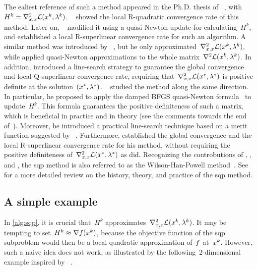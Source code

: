 The ealiest reference of such a method appeared in the Ph.D. thesis of \citeauthor{Wilson_1963}~\cite{Wilson_1963}, with~$H^k = \nabla_{x, x}^2 \lag(\iter[k], \lm[k])$.
~\cite{Robinson_1974} showed the local R-quadratic convergence rate of this method.
Later on, \citeauthor{Garcia-Palomares_Mangasarian_1976}~\cite{Garcia-Palomares_1973,Garcia-Palomares_Mangasarian_1976} modified it using a quasi-Newton update for calculating~$H^k$, and established a local R-superlinear convergence rate for such an algorithm.
A similar method was introduced by \citeauthor{Han_1976}~\cite{Han_1976,Han_1977}, but he only approximated~$\nabla_{x, x}^2 \lag(\iter[k], \lm[k])$, while \citeauthor{Garcia-Palomares_Mangasarian_1976} applied quasi-Newton approximations to the whole matrix~$\nabla^2 \lag(\iter[k], \lm[k])$.
In addition, \citeauthor{Han_1976} introduced a line-search strategy to guarantee the global convergence and local Q-superlinear convergence rate, requiring that~$\nabla_{x, x}^2 \lag(\iter[\ast], \lm[\ast])$ is positive definite at the solution~$(\iter[\ast], \lm[\ast])$.
~\cite{Powell_1978b,Powell_1978a,Powell_1978c} studied the method along the same direction.
In particular, he proposed to apply the damped BFGS quasi-Newton formula~\cite[Eqs.~(5.8),~(5.9), and~(5.10)]{Powell_1978b} to update~$H^k$.
This formula guarantees the positive definiteness of such a matrix, which is beneficial in practice and in theory (see the comments towards the end of~\cite[\S~2]{Powell_1978a}).
Moreover, he introduced a practical line-search technique based on a merit function suggested by \citeauthor{Han_1976}~\cite{Han_1976}.
Furthermore, \citeauthor{Powell_1978c} established the global convergence and the local R-superlinear convergence rate for his method, without requiring the positive definiteness of~$\nabla_{x, x}^2 \lag(\iter[\ast], \lm[\ast])$ as \citeauthor{Han_1976} did.
Recognizing the controbutions of \citeauthor{Wilson_1963}, , and \citeauthor{Powell_1978a}, the \gls{sqp} method is also referred to as the Wilson-Han-Powell method~\cite{Schittkowski_1981,Burke_1992}.
See~\cite{Boggs_Tolle_1995} for a more detailed review on the history, theory, and practice of the \gls{sqp} method.

\subsection{A simple example}

In \cref{alg:sqp}, it is crucial that~$H^k$ approximates~$\nabla_{x, x}^2 \lag(\iter[k], \lm[k])$.
It may be tempting to set~$H^k \approx \nabla \obj(\iter[k])$, because the objective function of the \gls{sqp} subproblem would then be a local quadratic approximation of~$f$ at~$\iter[k]$.
However, such a naive idea does not work, as illustrated by the following~$2$-dimensional example inspired by \citeauthor{Boggs_Tolle_1995}~\cite[\S~2.2]{Boggs_Tolle_1995}.

